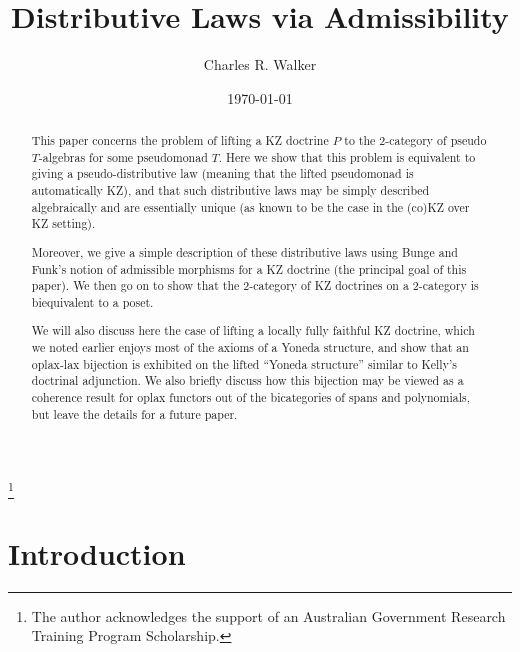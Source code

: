 \documentclass[a4paper,oneside,english]{amsart}
\numberwithin{equation}{section}
\numberwithin{figure}{section}
\theoremstyle{plain}
\theoremstyle{definition}
\theoremstyle{remark}
\theoremstyle{definition}
\theoremstyle{plain}
\theoremstyle{plain}
\theoremstyle{plain}
\begin{document}
\title{Distributive Laws via Admissibility}

\author{Charles R. Walker}



\address{Department of Mathematics, Macquarie University, NSW 2109, Australia}


\thanks{The author acknowledges the support of an Australian Government Research
Training Program Scholarship.}

\date{\today}
\begin{abstract}
This paper concerns the problem of lifting a KZ doctrine $P$ to the
2-category of pseudo $T$-algebras for some pseudomonad $T$. Here
we show that this problem is equivalent to giving a pseudo-distributive
law (meaning that the lifted pseudomonad is automatically KZ), and
that such distributive laws may be simply described algebraically
and are essentially unique (as known to be the case in the (co)KZ
over KZ setting). 

Moreover, we give a simple description of these distributive laws
using Bunge and Funk's notion of admissible morphisms for a KZ doctrine
(the principal goal of this paper). We then go on to show that the
2-category of KZ doctrines on a 2-category is biequivalent to a poset.

We will also discuss here the case of lifting a locally fully faithful
KZ doctrine, which we noted earlier enjoys most of the axioms of a
Yoneda structure, and show that an oplax-lax bijection is exhibited
on the lifted ``Yoneda structure'' similar to Kelly's doctrinal
adjunction. We also briefly discuss how this bijection may be viewed
as a coherence result for oplax functors out of the bicategories of
spans and polynomials, but leave the details for a future paper.

\tableofcontents{}
\end{abstract}

\maketitle

\section{Introduction}
\end{document}
